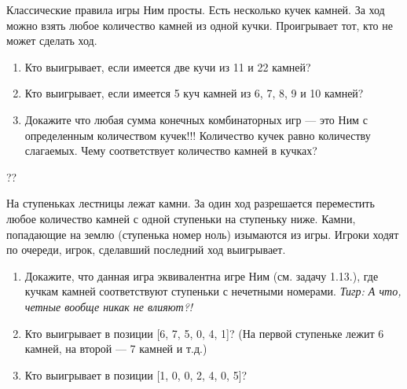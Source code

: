 \begin{problem}
Классические правила игры Ним просты. Есть несколько кучек камней. За ход можно взять любое количество камней из одной кучки. Проигрывает тот, кто не может сделать ход.\par
\begin{enumerate}
\item 	Кто выигрывает, если имеется две кучи из 11 и 22 камней?\par
\item 	Кто выигрывает, если имеется 5 куч камней из 6, 7, 8, 9 и 10 камней?\par
\item 	Докажите что любая сумма конечных комбинаторных игр --- это Ним с определенным количеством кучек!!! Количество кучек равно количеству слагаемых. Чему соответствует количество камней в кучках?
\end{enumerate}



\begin{sol}

\end{sol}
\end{problem}



\begin{problem}\par
\begin{source} \cite{sprague:uz}??\end{source}
На ступеньках лестницы лежат камни. За один ход разрешается переместить любое количество камней с одной ступеньки на ступеньку ниже. Камни, попадающие на землю (ступенька номер ноль) изымаются из игры. Игроки ходят по очереди, игрок, сделавший последний ход выигрывает.\par
\begin{enumerate}
\item 	Докажите, что данная игра эквивалентна игре Ним (см. задачу 1.13.), где кучкам камней соответствуют ступеньки с нечетными номерами. {\it Тигр: А что, четные вообще никак не влияют?!}\par
\item 	Кто выигрывает в позиции [6, 7, 5, 0, 4, 1]? (На первой ступеньке лежит 6 камней, на второй --- 7 камней и т.д.)\par
\item 	Кто выигрывает в позиции [1, 0, 0, 2, 4, 0, 5]?\par
\end{enumerate}


\begin{sol}

\end{sol}
\end{problem}

